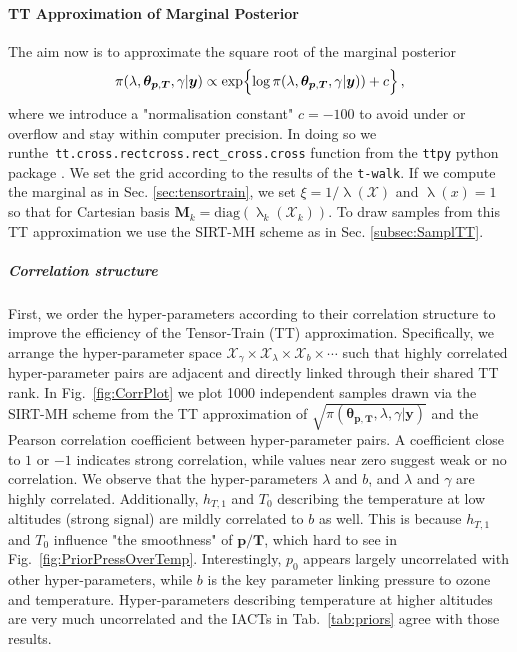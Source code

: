 \paragraph{TT Approximation of Marginal Posterior}
The aim now is to approximate the square root of the marginal posterior
\begin{align}
	\begin{split}
		\pi( \lambda,\bm{\theta}_{\bm{p}, \bm{T}},\gamma  | \bm{y}) \propto  \exp\Bigl\{\log{\pi( \lambda,\bm{\theta}_{\bm{p}, \bm{T}},\gamma  | \bm{y}) ) } + c \Bigr\}  
	\end{split} \, ,
	\label{eq:MargPostFullTT}
\end{align}
where we introduce a "normalisation constant" $c=-100$ to avoid under or overflow and stay within computer precision.
In doing so we run\linebreak the~\texttt{tt.cross.rectcross.rect\_cross.cross} function from the \texttt{ttpy} python package \cite{Oseledets2018ttpy}.
We set the grid according to the results of the \texttt{t-walk}.
If we compute the marginal as in Sec. \ref{sec:tensortrain}, we set $\xi = 1 / \uplambda (\mathcal{X})$ and $\uplambda(x) = 1$ so that for Cartesian basis $\bm{M}_k = \text{diag}(\uplambda_k(\mathcal{X}_k))$.
To draw samples from this TT approximation we use the SIRT-MH scheme as in Sec. \ref{subsec:SamplTT}.


\subparagraph{Correlation structure}
First, we order the hyper-parameters according to their correlation structure to improve the efficiency of the Tensor-Train (TT) approximation. 
Specifically, we arrange the hyper-parameter space $\mathcal{X}_{\gamma} \times \mathcal{X}_{\lambda} \times \mathcal{X}_{b} \times \cdots$ such that highly correlated hyper-parameter pairs are adjacent and directly linked through their shared TT rank.
In Fig.~\ref{fig:CorrPlot} we plot 1000 independent samples drawn via the SIRT-MH scheme from the TT approximation of $\sqrt{\pi( \bm{\theta}_{\bm{p}, \bm{T}},\lambda,\gamma  | \bm{y})}$ and the Pearson correlation coefficient between hyper-parameter pairs.
A coefficient close to $1$ or $-1$ indicates strong correlation, while values near zero suggest weak or no correlation.
We observe that the hyper-parameters $\lambda$ and $b$, and $\lambda$ and $\gamma$ are highly correlated.
Additionally, $h_{T,1}$ and $T_0$ describing the temperature at low altitudes (strong signal) are mildly correlated to $b$ as well.
This is because $h_{T,1}$ and $T_0$ influence "the smoothness" of $\bm{p}/\bm{T}$, which hard to see in Fig.~\ref{fig:PriorPressOverTemp}.
Interestingly, $p_0$ appears largely uncorrelated with other hyper-parameters, while $b$ is the key parameter linking pressure to ozone and temperature.
Hyper-parameters describing temperature at higher altitudes are very much uncorrelated and the IACTs in Tab.~\ref{tab:priors} agree with those results.


